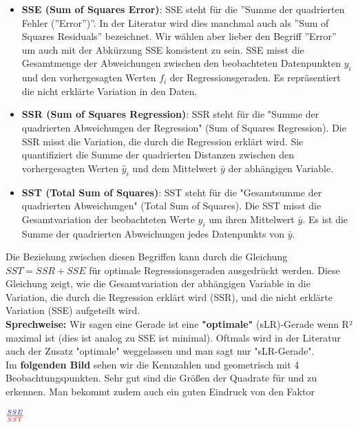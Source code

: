 \documentclass[12pt]{article}
\begin{document}
\begin{itemize}
    \item \textbf{SSE (Sum of Squares Error)}: SSE steht für die ”Summe der quadrierten Fehler (”Error”)”. In der Literatur wird dies manchmal auch als ”Sum of Squares Residuals” bezeichnet. Wir wählen aber lieber den Begriff ”Error” um auch mit der Abkürzung SSE konsistent zu sein. SSE misst die Gesamtmenge der Abweichungen zwischen den beobachteten Datenpunkten $y_i$ und den vorhergesagten Werten $ f_i $ der Regressionsgeraden. Es repräsentiert die nicht erklärte Variation in den Daten. 
    
    \item \textbf{SSR (Sum of Squares Regression)}: SSR steht für die "Summe der quadrierten Abweichungen der Regression" (Sum of Squares Regression). Die SSR misst die Variation, die durch die Regression erklärt wird. Sie quantifiziert die Summe der quadrierten Distanzen zwischen den vorhergesagten Werten \(\hat{y}_i\) und dem Mittelwert \(\bar{y}\) der abhängigen Variable.
    
    \item \textbf{SST (Total Sum of Squares)}: SST steht für die "Gesamtsumme der quadrierten Abweichungen" (Total Sum of Squares). Die SST misst die Gesamtvariation der beobachteten Werte \(y_i\) um ihren Mittelwert \(\bar{y}\). Es ist die Summe der quadrierten Abweichungen jedes Datenpunkts von \(\bar{y}\).
\end{itemize}
%
Die Beziehung zwischen diesen Begriffen kann durch die Gleichung \(SST = SSR + SSE\) für optimale Regressionsgeraden ausgedrückt werden. Diese Gleichung zeigt, wie die Gesamtvariation der abhängigen Variable in die Variation, die durch die Regression erklärt wird (SSR), und die nicht erklärte Variation (SSE) aufgeteilt wird.\\[0.2 cm]
% 
\textbf{Sprechweise:} Wir sagen eine Gerade ist eine \textbf{"optimale"} (sLR)-Gerade wenn R² maximal ist (dies ist analog zu SSE ist minimal). Oftmals wird in der Literatur auch der Zusatz "optimale" weggelassen und man sagt nur "sLR-Gerade".\\[0.4 cm]
% 
Im \textbf{folgenden Bild} sehen wir die Kennzahlen {\color{blue}{SSE}} und {\color{red}{SST}} geometrisch mit 4 Beobachtungspunkten. Sehr gut sind die Größen der Quadrate für {\color{blue}{SSE}} und {\color{red}{SST}} zu erkennen. Man bekommt zudem auch ein guten Eindruck von den Faktor 
\begin{large}
$ \frac{\color{blue}{SSE}}{\color{red}{SST}} $\\[16.8cm]
\end{large}
\end{document}
